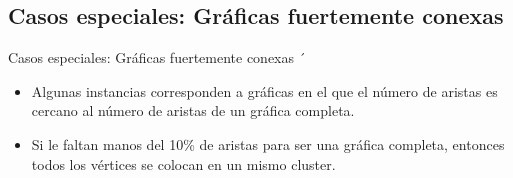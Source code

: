 \documentclass[10pt]{beamer}
\begin{document}
\subsection{Casos especiales: Gráficas fuertemente conexas}
\begin{frame}{Casos especiales: Gráficas fuertemente conexas}
´\begin{itemize}
\item Algunas instancias corresponden a gráficas en el que el número de aristas es cercano al número de aristas de un gráfica completa.

\item Si le faltan manos del 10\% de aristas para ser una gráfica completa, entonces todos los vértices se colocan en un mismo cluster.
\begin{table}[H]
\caption{Instancias fuertemente conexas}
\end{table} 
\end{itemize}
\end{frame}
\end{document}
